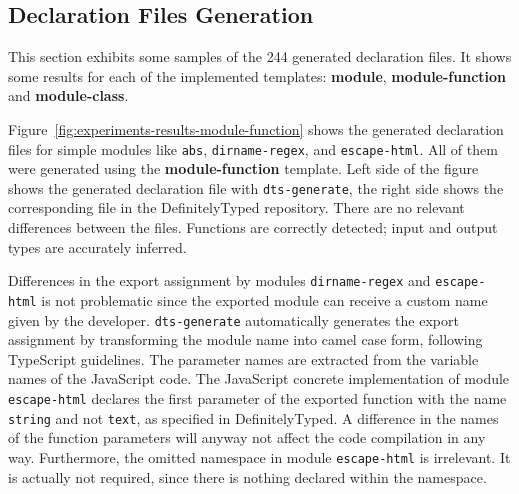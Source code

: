 \documentclass[english,cleveref,autoref,submission]{programming}
\newcommand{\figref}[1]{Figure~\ref{#1}}
\begin{document}
\subsection{Declaration Files Generation}
\label{sec:experiments-declaration-files-generation}

This section exhibits some samples of the 244 generated
declaration files. It shows some results for each of the implemented
templates: \textbf{module}, \textbf{module-function} and
\textbf{module-class}. 

\figref{fig:experiments-results-module-function} shows the generated
declaration files for simple modules like \texttt{abs},
\texttt{dirname-regex}, and \texttt{escape-html}. All of them were
generated using the \textbf{module-function} template. Left side of the figure shows the generated declaration file with
\lstinline{dts-generate}, the right side shows the corresponding file
in the DefinitelyTyped repository. There are no relevant
differences between the files. Functions are correctly detected; input and output types are accurately inferred.


Differences in the export assignment by modules \texttt{dirname-regex} and \texttt{escape-html} is not problematic since the exported module can receive a custom name given by the developer. \texttt{dts-generate} automatically generates the export assignment by transforming the module name into camel case form, following TypeScript guidelines. The parameter names are extracted from the variable names of the JavaScript code. The JavaScript concrete implementation of module \texttt{escape-html} declares the first parameter of the exported function with the name \texttt{string} and not \texttt{text}, as specified in DefinitelyTyped. A difference in the names of the function parameters will anyway not affect the code compilation in any way. Furthermore, the omitted namespace in module \texttt{escape-html} is irrelevant. It is actually not required, since there is nothing declared within the namespace.
 
\end{document}
